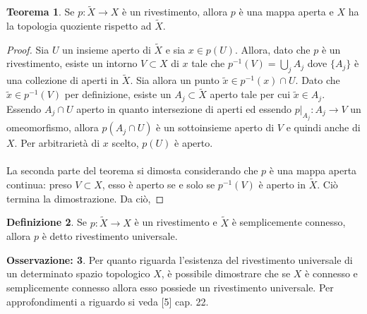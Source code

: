 \documentclass[12pt,a4paper]{report}
\theoremstyle{definition}
\newtheorem{Def}{Definizione}[chapter]
\theoremstyle{Theorem}
\newtheorem{Theo}[Def]{Teorema}
\theoremstyle{definition}
\theoremstyle{definition}
\theoremstyle{definition}
\newtheorem{Obs}[Def]{Osservazione:}
\begin{document}
\begin{Theo}
	Se $p:\tilde{X}\rightarrow X$ è un rivestimento, allora $p$ è una mappa aperta e $X$ ha la topologia quoziente rispetto ad $\tilde{X}$.
\end{Theo}
\begin{proof}
	Sia $U$
 un insieme aperto di $\tilde{X}$ e sia $x\in p(U)$. Allora, dato che $p$ è un rivestimento, esiste un intorno $V\subset X$ di $x$ tale che $p^{-1}(V)=\bigcup_jA_j$ dove $\{A_j\}$ è una collezione di aperti in $\tilde{X}$. Sia allora un punto $\tilde{x}\in p^{-1}(x)\cap U$. Dato che $\tilde{x}\in p^{-1}(V)$ per definizione, esiste un $A_j\subset \tilde{X}$ aperto tale per cui $\tilde{x}\in A_j$. Essendo $A_j\cap U$ aperto in quanto intersezione di aperti ed essendo $p|_{A_j}:A_j\rightarrow V$ un omeomorfismo, allora $p(A_j\cap U)$ è un sottoinsieme aperto di $V$ e quindi anche di $X$. Per arbitrarietà di $x$ scelto, $p(U)$ è aperto.\\
 \\
 La seconda parte del teorema si dimosta considerando che $p$ è una mappa aperta continua: preso $V\subset X$, esso è aperto se e solo se $p^{-1}(V)$ è aperto in $\tilde{X}$. Ciò termina la dimostrazione.
 Da ciò, 
\end{proof}
\begin{Def}
	Se $p:\tilde{X}\rightarrow X$ è un rivestimento e $\tilde{X}$ è semplicemente connesso, allora $p$ è detto rivestimento universale.
\end{Def}
\begin{Obs}
	Per quanto riguarda l'esistenza del rivestimento universale di un determinato spazio topologico $X$, è possibile dimostrare che se $X$ è connesso e semplicemente connesso allora esso possiede un rivestimento universale. Per approfondimenti a riguardo si veda [5] cap. 22.
\end{Obs}
\end{document}
